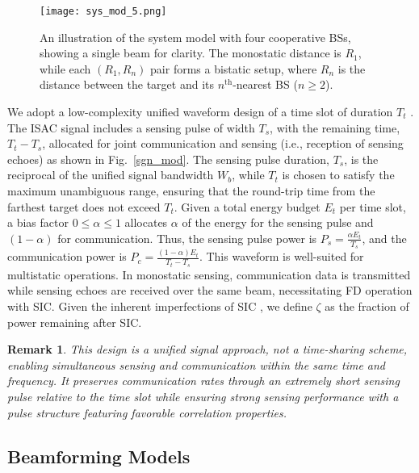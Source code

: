 \documentclass[journal]{IEEEtran}
\newtheorem{remark}{\textbf{Remark}}
\begin{document}
\begin{figure}[t]
\centering
  \texttt{[image: sys\_mod\_5.png]}
    \caption{An illustration of the system model with four cooperative BSs, showing a single beam for clarity. The monostatic distance is \( R_1 \), while each \( (R_1, R_n) \) pair forms a bistatic setup, where \( R_n \) is the distance between the target and its \( n^\text{th} \)-nearest BS (\( n \geq 2 \)).
} 
    \label{sys_mod}
\end{figure}






We adopt a low-complexity unified waveform design of a time slot of duration \( T_t \) \cite{xiao2022waveform}. The ISAC signal includes a sensing pulse of width \( T_s \), with the remaining time, \( T_t - T_s \), allocated for joint communication and sensing (i.e., reception of sensing echoes) as shown in Fig.~\ref{sgn_mod}. The sensing pulse duration, \( T_s \), is the reciprocal of the unified signal bandwidth \( W_b \), while \( T_t \) is chosen to satisfy the maximum unambiguous range, ensuring that the round-trip time from the farthest target does not exceed \( T_t \).
Given a total energy budget \( E_t \) per time slot, a bias factor \( 0 \leq \alpha \leq 1 \) allocates \(\alpha\) of the energy for the sensing pulse and \(( 1-\alpha )\) for communication. Thus, the sensing pulse power is \( P_s = \frac{\alpha E_t}{T_s} \), and the communication power is \( P_c = \frac{(1-\alpha) E_t}{T_t - T_s} \).
This waveform is well-suited for multistatic operations. In monostatic sensing, communication data is transmitted while sensing echoes are received over the same beam, necessitating FD operation with SIC. Given the inherent imperfections of SIC \cite{wei2023integrated, xiao2022waveform}, we define \( \zeta \) as the fraction of power remaining after SIC.




 
\begin{remark}
This design is a unified signal approach, not a time-sharing scheme, enabling simultaneous sensing and communication within the same time and frequency. It preserves communication rates through an extremely short sensing pulse relative to the time slot while ensuring strong sensing performance with a pulse structure featuring favorable correlation properties. 
\end {remark}



\subsection{Beamforming Models}
\end{document}
